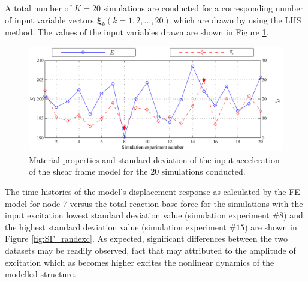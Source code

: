 \documentclass[preprint,3p,review,times,11pt]{elsarticle}
\newcommand{\bld}[1]{\boldsymbol{#1}}
\newcommand{\bxi}{\bld{\xi}}
\begin{document}
A total number of $K = 20$ simulations are conducted for a corresponding number of input variable vectors $\bxi_k (k=1,2,\ldots,20)$ which are drawn by using the LHS method. The values of the input variables drawn are shown in Figure \ref{fig:mprops}.

\begin{figure}[t!]
\begin{center}
\includegraphics[width = 1\textwidth]{figs/SF_unprops.pdf}
\caption{Material properties and standard deviation of the input acceleration of the shear frame model for the 20 simulations conducted. \label{fig:mprops}}
\end{center}
\end{figure}

The time-histories of the model's displacement response as calculated by the FE model for node 7 versus the total reaction base force for the simulations with the input excitation lowest standard deviation value (simulation experiment $\#8$) and the highest standard deviation value (simulation experiment $\#15$) are shown in Figure \ref{fig:SF_randexc}. As expected, significant differences between the two datasets may be readily observed, fact that may attributed to the amplitude of excitation which as becomes higher excites the nonlinear dynamics of the modelled structure.
\end{document}
